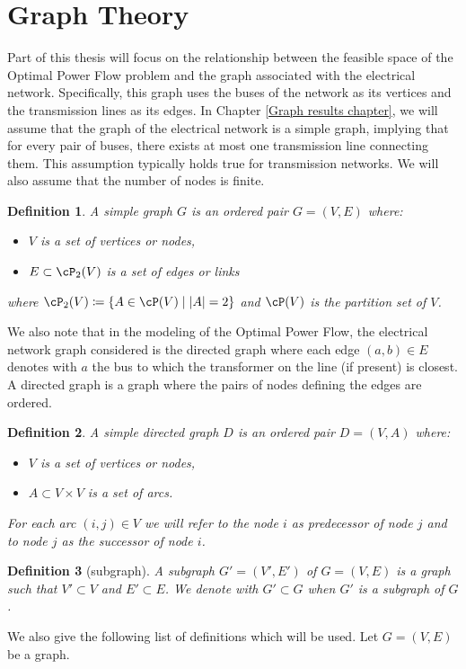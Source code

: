 \documentclass[11pt,a4paper,oneside,openany]{book}
\newtheorem{definition}{Definition}
\numberwithin{definition}{section}
\numberwithin{theorem}{section}
\numberwithin{problem}{section}
\begin{document}
\section{Graph Theory}
\label{Graph Theory Chapter}
 Part of this thesis will focus on the relationship between the feasible space of the Optimal Power Flow problem and the graph associated with the electrical network. Specifically, this graph uses the buses of the network as its vertices and the transmission lines as its edges. In Chapter \ref{Graph results chapter}, we will assume that the graph of the electrical network is a simple graph, implying that for every pair of buses, there exists at most one transmission line connecting them. This assumption typically holds true for transmission networks. We will also assume that the number of nodes is finite.
\begin{definition}
    A \emph{simple graph} \( G \) is an ordered pair \( G = (V, E) \) where:
\begin{itemize}
    \item \( V \) is a set of \emph{vertices} or \emph{nodes},
    \item \( E\subset \cP_2(V) \) is a set of \emph{edges} or \emph{links}
\end{itemize}
where $\cP_2(V) \coloneqq \{A \in \cP(V) \mid |A| = 2\}$ and $\cP(V)$ is the partition set of $V$.
\end{definition}

We also note that in the modeling of the Optimal Power Flow, the electrical network graph considered is the directed graph where each edge $(a,b) \in E$ denotes with $a$ the bus to which the transformer on the line (if present) is closest. A directed graph is a graph where the pairs of nodes defining the edges are ordered.
\begin{definition}
     A \emph{simple directed graph} \( D \) is an ordered pair \( D = (V, A) \) where:
\begin{itemize}
    \item \( V \) is a set of \emph{vertices} or \emph{nodes},
    \item \( A \subset V \times V \) is a set of \emph{arcs}.
\end{itemize}
For each arc $(i,j) \in V$ we will refer to the node $i$ as \emph{predecessor} of node $j$ and to node $j$ as the successor of node $i$.
\end{definition}


\begin{definition}[subgraph]
    A subgraph \(G' = (V', E')\) of \(G = (V, E)\) is a graph such that \(V' \subset V\) and \(E' \subset E\). We denote with $G' \subset G$ when $G'$ is a subgraph of $G$.
\end{definition}
We also give the following list of definitions which will be used. Let \(G = (V, E)\) be a graph.
\end{document}
